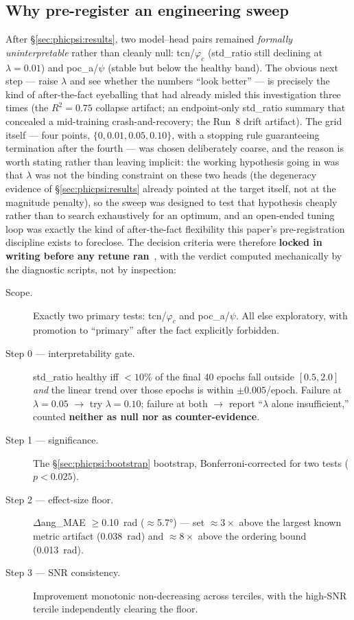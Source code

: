 \subsection{Why pre-register an engineering sweep}
\label{subsec:why-pre-register-an-engineering-sweep}

After \S\ref{sec:phicpsi:results}, two model--head pairs remained \emph{formally uninterpretable} rather than cleanly null: tcn/$\varphi_c$ (std\_ratio still declining at $\lambda = 0.01$) and poc\_a/$\psi$ (stable but below the healthy band).
The obvious next step --- raise $\lambda$ and see whether the numbers ``look better'' --- is precisely the kind of after-the-fact eyeballing that had already misled this investigation three times (the $R^2 = 0.75$ collapse artifact; an endpoint-only std\_ratio summary that concealed a mid-training crash-and-recovery; the Run~8 drift artifact).
The grid itself --- four points, $\{0, 0.01, 0.05, 0.10\}$, with a stopping rule guaranteeing termination after the fourth --- was chosen deliberately coarse, and the reason is worth stating rather than leaving implicit: the working hypothesis going in was that $\lambda$ was not the binding constraint on these two heads (the degeneracy evidence of \S\ref{sec:phicpsi:results} already pointed at the target itself, not at the magnitude penalty), so the sweep was designed to test that hypothesis cheaply rather than to search exhaustively for an optimum, and an open-ended tuning loop was exactly the kind of after-the-fact flexibility this paper's pre-registration discipline exists to foreclose.
The decision criteria were therefore \textbf{locked in writing before any retune ran}~\citep{nosek2018preregistration}, with the verdict computed mechanically by the diagnostic scripts, not by inspection:

\begin{description}
\item[Scope.]
Exactly two primary tests: tcn/$\varphi_c$ and poc\_a/$\psi$.
All else exploratory, with promotion to ``primary'' after the fact explicitly forbidden.
\item[Step 0 --- interpretability gate.] std\_ratio healthy iff ${<}10\%$ of the final 40 epochs fall outside $[0.5, 2.0]$ \emph{and} the linear trend over those epochs is within $\pm 0.005$/epoch.
Failure at $\lambda = 0.05$ $\to$ try $\lambda = 0.10$; failure at both $\to$ report ``$\lambda$ alone insufficient,'' counted \textbf{neither as null nor as counter-evidence}.
\item[Step 1 --- significance.]
The \S\ref{sec:phicpsi:bootstrap} bootstrap, Bonferroni-corrected for two tests ($p < 0.025$).
\item[Step 2 --- effect-size floor.]
$\Delta$ang\_MAE $\ge {}$\SI{0.10}{\radian} ($\approx {}$\ang{5.7}) --- set $\approx 3\times$ above the largest known metric artifact (\SI{0.038}{\radian}) and $\approx 8\times$ above the ordering bound (\SI{0.013}{\radian}).
\item[Step 3 --- SNR consistency.]
Improvement monotonic non-decreasing across terciles, with the high-SNR tercile independently clearing the floor.
\end{description}

